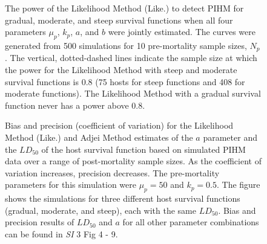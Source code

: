 \documentclass[12pt, a4paper]{article}
\begin{document}
\begin{figure}

    \captionsetup{justification=raggedright, singlelinecheck=false}

    \caption{The power of the Likelihood Method (Like.) to detect PIHM for gradual, moderate, and steep survival functions when all four parameters $\mu_p$, $k_p$, $a$, and $b$ were jointly estimated. The curves were generated from 500 simulations for 10 pre-mortality sample sizes, $N_p$. The vertical, dotted-dashed lines indicate the sample size at which the power for the Likelihood Method with steep and moderate survival functions is 0.8 (75 hosts for steep functions and 408 for moderate functions). The Likelihood Method with a gradual survival function never has a power above 0.8.}

    \label{fig:real_power}

\end{figure}

\begin{figure}


    \captionsetup{justification=raggedright, singlelinecheck=false}

    \caption{Bias and precision (coefficient of variation) for the Likelihood Method (Like.) and Adjei Method estimates of the $a$ parameter and the $LD_{50}$ of the host survival function based on simulated PIHM data over a range of post-mortality sample sizes.  As the coefficient of variation increases, precision decreases. The pre-mortality parameters for this simulation were $\mu_p = 50$ and $k_p = 0.5$.  The figure shows the simulations for three different host survival functions (gradual, moderate, and steep), each with the same $LD_{50}$.  Bias and precision results of $LD_{50}$ and $a$ for all other parameter combinations can be found in \emph{SI} 3 Fig 4 - 9.}

    \label{fig:question2}

\end{figure}
\end{document}

